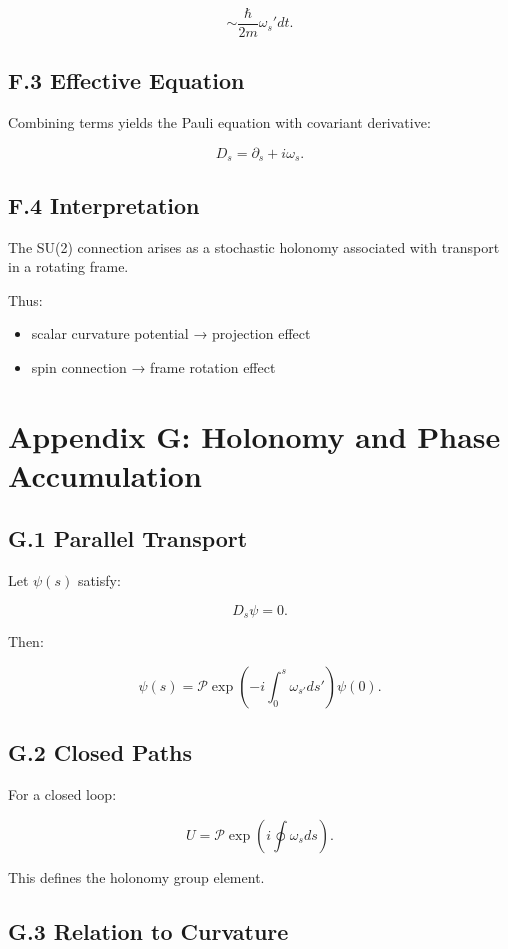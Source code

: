 \documentclass[11pt]{article}
\begin{document}
\[
\sim \frac{\hbar}{2m} \omega_s' dt.
\]

\subsection*{F.3 Effective Equation}

Combining terms yields the Pauli equation with covariant derivative:

\[
D_s = \partial_s + i \omega_s.
\]

\subsection*{F.4 Interpretation}

The SU(2) connection arises as a stochastic holonomy associated with transport in a rotating frame.

Thus:

\begin{itemize}
\item scalar curvature potential → projection effect
\item spin connection → frame rotation effect
\end{itemize}


\section*{Appendix G: Holonomy and Phase Accumulation}

\subsection*{G.1 Parallel Transport}

Let $\psi(s)$ satisfy:

\[
D_s \psi = 0.
\]

Then:

\[
\psi(s) = \mathcal{P} \exp\left(-i \int_0^s \omega_{s'} ds' \right)\psi(0).
\]

\subsection*{G.2 Closed Paths}

For a closed loop:

\[
U = \mathcal{P} \exp\left(i \oint \omega_s ds \right).
\]

This defines the holonomy group element.

\subsection*{G.3 Relation to Curvature}
\end{document}
